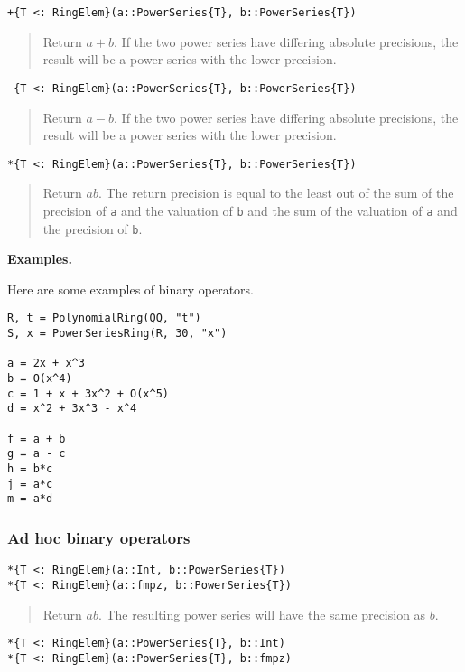 \documentclass[a4paper,10pt]{article}
\newcommand{\code}{\lstinline}
\newcommand{\desc}[1]{\vspace{-3mm}\begin{quote}#1\end{quote}}
\begin{document}
\begin{lstlisting}
+{T <: RingElem}(a::PowerSeries{T}, b::PowerSeries{T})
\end{lstlisting}

\desc{Return $a + b$. If the two power series have differing absolute
precisions, the result will be a power series with the lower precision.}

\begin{lstlisting}
-{T <: RingElem}(a::PowerSeries{T}, b::PowerSeries{T})
\end{lstlisting}

\desc{Return $a - b$. If the two power series have differing absolute
precisions, the result will be a power series with the lower precision.}

\begin{lstlisting}
*{T <: RingElem}(a::PowerSeries{T}, b::PowerSeries{T})
\end{lstlisting}

\desc{Return $ab$. The return precision is equal to the least out of the
sum of the precision of \code{a} and the valuation of \code{b} and
the sum of the valuation of \code{a} and the precision of \code{b}.}

\textbf{Examples.}

Here are some examples of binary operators.

\begin{lstlisting}
R, t = PolynomialRing(QQ, "t")
S, x = PowerSeriesRing(R, 30, "x")

a = 2x + x^3
b = O(x^4)
c = 1 + x + 3x^2 + O(x^5)
d = x^2 + 3x^3 - x^4

f = a + b
g = a - c
h = b*c
j = a*c
m = a*d
\end{lstlisting}

\subsubsection{Ad hoc binary operators}

\begin{lstlisting}
*{T <: RingElem}(a::Int, b::PowerSeries{T})
*{T <: RingElem}(a::fmpz, b::PowerSeries{T})
\end{lstlisting}

\desc{Return $ab$. The resulting power series will have the same precision as
$b$.}

\begin{lstlisting}
*{T <: RingElem}(a::PowerSeries{T}, b::Int)
*{T <: RingElem}(a::PowerSeries{T}, b::fmpz)
\end{lstlisting}
\end{document}
